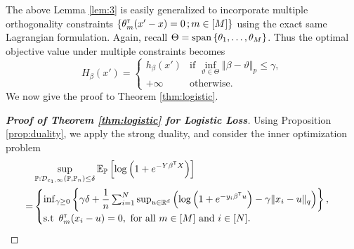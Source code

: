\documentclass[12pt]{article}
\begin{document}
The above Lemma \ref{lem:3} is easily generalized to incorporate multiple orthogonality constraints $\{\theta_m^{\scriptscriptstyle \sf T} (x'-x) =0\,;m\in [M]\}$ using the exact same Lagrangian formulation. Again, recall $\Theta = \operatorname{span}{\{\theta_1,\ldots,\theta_M\}}$. Thus the optimal objective value under multiple constraints becomes \[
H_\beta(x') = \begin{cases}
   h_\beta(x') &\text{if }\inf_{\vartheta\in\Theta} \Vert \beta -\vartheta \Vert_p \leq \gamma,\\
   +\infty & \text{otherwise.}
\end{cases}
\]
We now give the proof to Theorem \ref{thm:logistic}.

\begin{proof}[\textbf{Proof of Theorem \ref{thm:logistic} for Logistic Loss}]
    Using Proposition \ref{prop:duality}, we apply the strong duality, and consider the inner optimization problem \begin{align*}
        &\sup_{\mathbb{P}:\mathcal{D}_{c_1,\infty}(\mathbb{P},\mathbb{P}_n)\leq \delta} \mathbb{E}_{\mathbb{P}}\left[\log{\left(1+e^{-Y\beta^{\scriptscriptstyle \sf T}X}\right)}\right]  \\
    =&\begin{cases}
        \inf_{\gamma \geq 0}\left\{\gamma\delta + \dfrac{1}{n}\sum_{i=1}^N \sup_{u\in\mathbb{R}^d}\left(\log{\left(1+e^{-y_i\beta^{\scriptscriptstyle \sf T}u} \right)}-\gamma \Vert x_i-u\Vert_q\right) \right\}, &\\
        \text{s.t }\,\theta_m^{\scriptscriptstyle \sf T} (x_i-u) = 0, \text{ for all }m\in [M] \text{ and }i\in[N].
    \end{cases}
    \end{align*}
    

\end{proof}
\end{document}
